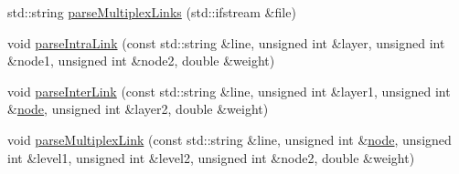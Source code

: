 \begin{DoxyCompactItemize}
\item 
std\+::string \mbox{\hyperlink{classMultiplexNetwork_ad881d099c442d8e2ad242f357a3f97d7}{parse\+Multiplex\+Links}} (std\+::ifstream \&file)
\item 
void \mbox{\hyperlink{classMultiplexNetwork_a3d6c1aff64a77c74e9c998a796762777}{parse\+Intra\+Link}} (const std\+::string \&line, unsigned int \&layer, unsigned int \&node1, unsigned int \&node2, double \&weight)
\item 
void \mbox{\hyperlink{classMultiplexNetwork_a48d45b3e0738f2e755e67ebf7aeac728}{parse\+Inter\+Link}} (const std\+::string \&line, unsigned int \&layer1, unsigned int \&\mbox{\hyperlink{structnode}{node}}, unsigned int \&layer2, double \&weight)
\item 
void \mbox{\hyperlink{classMultiplexNetwork_acb4b8c1bb1c8d4fd613ca467436e18eb}{parse\+Multiplex\+Link}} (const std\+::string \&line, unsigned int \&\mbox{\hyperlink{structnode}{node}}, unsigned int \&level1, unsigned int \&level2, unsigned int \&node2, double \&weight)
\end{DoxyCompactItemize}
